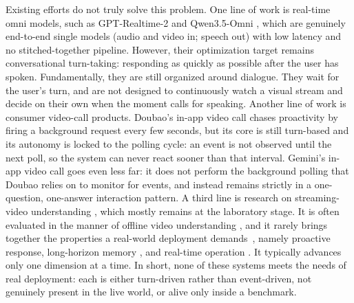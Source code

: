 \documentclass{llmxive}
\begin{document}
Existing efforts do not truly solve this problem. One line of work is real-time omni models, such as GPT-Realtime-2 \cite{openai2026gptrealtime2} and Qwen3.5-Omni \cite{qwen2026omni}, which are genuinely end-to-end single models (audio and video in; speech out) with low latency and no stitched-together pipeline. 
However, their optimization target remains conversational turn-taking: responding as quickly as possible after the user has spoken. Fundamentally, they are still organized around dialogue. They wait for the user's turn, and are not designed to continuously watch a visual stream and decide on their own when the moment calls for speaking.
Another line of work is consumer video-call products. Doubao's in-app video call \cite{seed2_2026} chases proactivity by firing a background request every few seconds, but its core is still turn-based and its autonomy is locked to the polling cycle: an event is not observed until the next poll, so the system can never react sooner than that interval.
Gemini's in-app video call \cite{gemini31flashlive} goes even less far: it does not perform the background polling that Doubao relies on to monitor for events, and instead remains strictly in a one-question, one-answer interaction pattern.
A third line is research on streaming-video understanding \cite{qian2025dispider,qian2025streaming,videollm-online,wang2024mmduet,yan2026proactvl,guan2026videostreamingthinking,awesomevlmstreaming}, which mostly remains at the laboratory stage. It is often evaluated in the manner of offline video understanding \cite{li2025ovobenchfarvideollmsrealworld,lin2024streamingbenchassessinggapmllms}, and it rarely brings together the properties a real-world deployment demands~\cite{yao2026harnessingstreamingvideowild}, namely proactive response\cite{xia2025streamingvideoinstructiontuning,qian2025dispider,yan2026proactvl}, long-horizon memory \cite{yao2025timechatonline,zhang2026hermeskvcachehierarchical,zeng2026streamforest}, and real-time operation \cite{xu2025streamingvlmrealtimeunderstandinginfinite,wang2026acceleratingstreamingvideolarge}. 
It typically advances only one dimension at a time. In short, none of these systems meets the needs of real deployment: each is either turn-driven rather than event-driven, not genuinely present in the live world, or alive only inside a benchmark.
\end{document}
